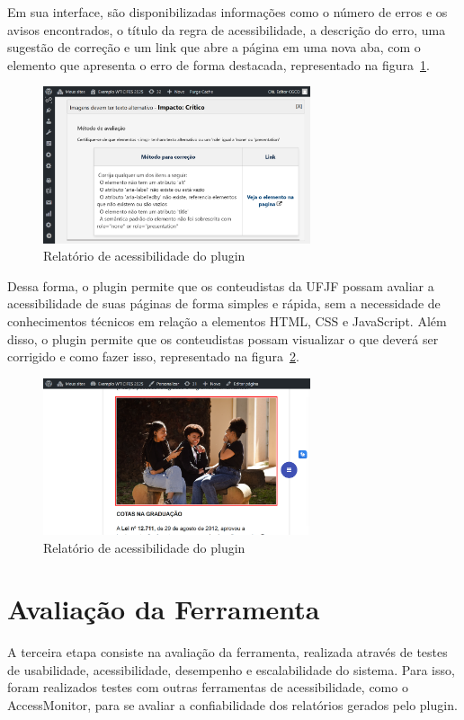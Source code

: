 \documentclass[
	article,			%
	12pt,				%
	oneside,			%
	a4paper,			%
	section=TITLE,		%
	subsection=TITLE,	%
	english,			%
	brazil,				%
	sumario=tradicional
	]{abntex2}
\begin{document}
Em sua interface, são disponibilizadas informações
como o número de erros e os avisos encontrados,
o título da regra de acessibilidade, a descrição do erro, uma sugestão de correção 
e um link que abre a página em uma nova aba, com o elemento que apresenta o erro de
forma destacada, representado na figura~\ref{fig:relatorio2}.

\begin{figure}[h]
    \centering
    \caption{Relatório de acessibilidade do plugin}
    \label{fig:relatorio2}
\includegraphics[width=0.7\textwidth]{imagem3.png}
\end{figure}

Dessa forma, o plugin permite que os conteudistas da UFJF possam avaliar a
acessibilidade de suas páginas de forma simples e rápida, sem a necessidade
de conhecimentos técnicos em relação a elementos HTML, CSS e JavaScript.
Além disso, o plugin permite que os conteudistas possam visualizar o que
deverá ser corrigido e como fazer isso, representado na figura~\ref{fig:relatorio3}.

\begin{figure}[h]
    \centering
    \caption{Relatório de acessibilidade do plugin}
    \label{fig:relatorio3}
\includegraphics[width=0.7\textwidth]{imagem4.png}
\end{figure}


\chapter*{Avaliação da Ferramenta}
A terceira etapa consiste na avaliação da ferramenta, realizada 
através de testes de usabilidade, acessibilidade, desempenho e escalabilidade
do sistema. Para isso, foram realizados testes com outras ferramentas de
acessibilidade, como o AccessMonitor, para se avaliar a
confiabilidade dos relatórios gerados pelo plugin.
\end{document}
